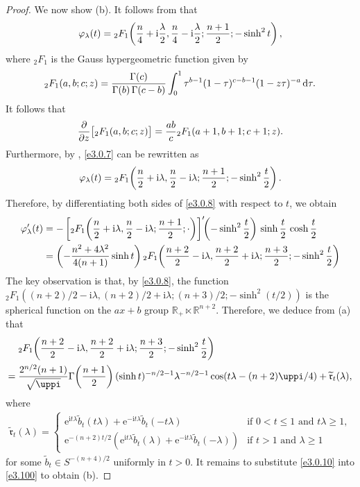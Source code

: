 \documentclass[a4paper,12pt]{amsart}
\numberwithin{equation}{section}
\theoremstyle{definition}
\theoremstyle{remark}
\numberwithin{theorem}{section}
\newcommand{\R}{\mathbb{R}}
\newcommand{\e}{\mathrm{e}}
\renewcommand{\i}{\mathrm{i}}
\renewcommand{\d}{\mathrm{d}}
\begin{document}
\begin{proof}
We now show (b). It follows from \cite[p. 5616]{AnPiVa} that
\begin{align}\label{e3.0.7}
\varphi_\lambda(t)={}_2F_1\!\left({n\over 4}+\i{\lambda\over 2},{n\over 4}-\i{\lambda\over 2};{n+1\over 2};-\sinh^2t\right),
\end{align}
where ${}_2F_1$ is the Gauss hypergeometric function given by
\begin{align*}
{}_2F_1(a,b;c;z)={\Gamma(c)\over \Gamma(b)\,\Gamma(c-b)}\int_0^1\tau^{b-1}(1-\tau)^{c-b-1}(1-z\tau)^{-a}\,\d \tau.
\end{align*}
It follows that
\begin{align*}
{\partial\over \partial z}\big[{}_2F_1(a,b;c;z)\big]={ab\over c}{}_2F_1(a+1,b+1;c+1;z).
\end{align*}
Furthermore, by \cite[p. 112, (18)]{Er}, \eqref{e3.0.7} can be rewritten as
\begin{align}\label{e3.0.8}
\varphi_\lambda(t)={}_2F_1\!\left({n\over 2}+\i\lambda,{n\over 2}-\i\lambda;{n+1\over 2};-\sinh^2{t\over 2}\right).
\end{align}
Therefore, by differentiating both sides of \eqref{e3.0.8} with respect to $t$, we obtain
\begin{align}
\varphi_\lambda'(t)&=-\left[{}_2F_1\!\left({n\over 2}+\i\lambda,{n\over 2}-\i\lambda;{n+1\over 2};\cdot\right)\right]'\!\!\left(-\sinh^2{t\over 2}\right)\,\sinh{t\over 2}\,\cosh{t\over 2}\label{e3.100}\\ 
&=\left(-{n^2+4\lambda^2\over 4(n+1)}\sinh t \right){}_2F_1\!\left({n+2\over 2}-\i\lambda,{n+2\over 2}+\i\lambda;{n+3\over 2};-\sinh^2{t\over 2}\right)\notag
\end{align}
The key observation is that, by \eqref{e3.0.8}, the function ${}_2F_1((n+2)/2-\i\lambda,(n+2)/2+\i\lambda;(n+3)/2;-\sinh^2(t/2))$ is the spherical function on the $ax+b$ group $\R_+\ltimes\R^{n+2}$. Therefore, we deduce from (a) that
\begin{align}
{}&{}_2F_1\!\left({n+2\over 2}-\i\lambda,{n+2\over 2}+\i\lambda;{n+3\over 2};-\sinh^2{t\over 2}\right)\label{e3.0.10}\\
={}&{2^{n/2}(n+1)\over\sqrt{\uppi}}\Gamma\!\left({n+1\over 2}\right) (\sinh t)^{-n/2-1} \lambda^{-n/2-1}\cos(t\lambda-(n+2)\uppi/4)+\widetilde{\mathfrak{r}}_t(\lambda),\notag
\end{align}
where
\begin{align*}
\widetilde{\mathfrak{r}}_t(\lambda)=\begin{cases}
\e^{\i t\lambda}\widetilde{b}_t(t\lambda)+\e^{-\i t\lambda}\widetilde{b}_t(-t\lambda)&\mbox{if }0<t\leq 1 \mbox{ and }t\lambda\geq 1,\\
\e^{-(n+2)t/2}\left(\e^{\i t\lambda}\widetilde{b}_t(\lambda)+\e^{-\i t\lambda}\widetilde{b}_t(-\lambda)\right)&\mbox{if }t>1 \mbox{ and }\lambda\geq 1
\end{cases}
\end{align*}
for some $\widetilde{b}_t\in S^{-(n+4)/2}$ uniformly in $t>0$. It remains to substitute \eqref{e3.0.10} into \eqref{e3.100} to obtain (b).
\end{proof}
\medskip
\end{document}
